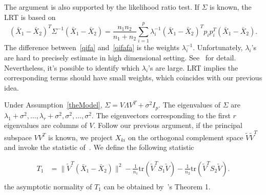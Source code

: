 \documentclass[review]{elsarticle}
\theoremstyle{plain}
\theoremstyle{definition}
\theoremstyle{remark}
\begin{document}
The argument is also supported by the likelihood ratio test. If $\Sigma$ is known, the LRT is based on 
\begin{equation}\label{qifafa}
    {(\bar{X}_1-\bar{X}_2)}^T\Sigma^{-1}(\bar{X}_1-\bar{X}_2)=\frac{n_1 n_2}{n_1+n_2}\sum_{i=1}^p \lambda_i^{-1}{(\bar{X}_1-\bar{X}_2)}^T  p_i p_i^T (\bar{X}_1-\bar{X}_2).
\end{equation}
The difference between~\eqref{qifa} and~\eqref{qifafa} is the weights $\lambda_i^{-1}$.
Unfortunately, $\lambda_i$'s are hard to precisely estimate in high dimensional setting. See~\cite{bai2010spectral} for detail. Nevertheless, it's possible to identify which $\lambda_i$'s are large. LRT implies the corresponding terms should have small weights, which coincides with our previous idea.


Under Assumption~\ref{theModel}, $\Sigma=V\Lambda V^T +\sigma^2 I_p$. The eigenvalues of $\Sigma$ are $\lambda_1+\sigma^2,\ldots,\lambda_r+\sigma^2,\sigma^2,\ldots,\sigma^2$. The eigenvectors corresponding to the first $r$ eigenvalues are columns of $V$. Follow our previous argument, if the principal subspace $VV^T$ is known, we project $X_{ki}$ on the orthogonal complement space $\tilde{V}\tilde{V}^T$ and invoke the statistic of~\cite{Chen2010A}. We define the following statistic

\begin{equation*}
\begin{aligned}
    T_{1}&=\|\tilde{V}^T(\bar{X}_1-\bar{X}_2)\|^2-\frac{1}{n_1}\mathrm{tr}(\tilde{V}^T S_1\tilde{V})-\frac{1}{n_2}\mathrm{tr}(\tilde{V}^T S_2\tilde{V}).
    \\
\end{aligned}
\end{equation*}
the asymptotic normality of $T_1$ can be obtained by~\cite{Chen2010A}'s Theorem 1.
\end{document}

